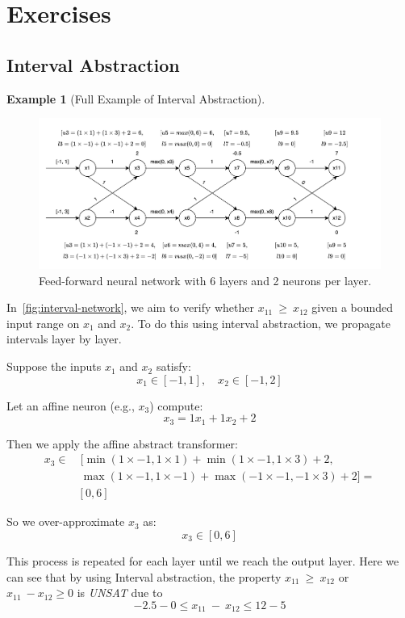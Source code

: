 \documentclass[oneside,11pt,dvipsnames]{book}
\numberwithin{equation}{section}
\theoremstyle{definition}
\newtheorem{example}{Example}[section]
\theoremstyle{remark}
\newcommand{\hd}[1]{\iftoggle{usecomment}{{\color{blue}{[HD]: #1}}}{}}
\begin{document}
\section{Exercises}
\subsection{Interval Abstraction}

\begin{example}[Full Example of Interval Abstraction]\label{ex:interval-abstraction-full}
\begin{figure}[h]
    \centering
    \includegraphics[width=1.2\linewidth]{figure/2_layers_example.png}
    \caption{Feed-forward neural network with 6 layers and 2 neurons per layer.}
    \label{fig:interval-network}
\end{figure}
In~\autoref{fig:interval-network}, we aim to verify whether \(x_{11}\ \geq\ x_{12}\) given a bounded input range on \(x_1\) and \(x_2\). To do this using interval abstraction, we propagate intervals layer by layer.

Suppose the inputs \(x_1\) and \(x_2\) satisfy:
\[
x_1 \in [-1, 1], \quad x_2 \in [-1, 2]
\]

Let an affine neuron (e.g., \(x_3\)) compute:
\[
x_3 = 1 x_1 + 1 x_2 + 2
\]

Then we apply the affine abstract transformer:
\begin{equation}
\begin{aligned}
  x_3 \in & ~[\min(1\times-1, 1\times1) + \min(1\times-1, 1\times3) + 2, \\
          & ~\max(1\times-1, 1\times-1) + \max(-1\times-1, -1\times3) + 2] = \\
          & [0,6]
\end{aligned}         
\end{equation}

So we over-approximate \(x_3\) as:
\[
x_3 \in [0, 6]
\]

This process is repeated for each layer until we reach the output layer.
Here we can see that by using Interval abstraction, the property \(x_{11}\ \geq\ x_{12}\) or  \(x_{11}\ - x_{12} \geq 0\) is \textit{UNSAT}\hd{seems incorrect} due to
\[
-2.5 - 0  \leq x_{11}\ -\ x_{12} \leq 12 - 5
\]
\end{example}
\end{document}
